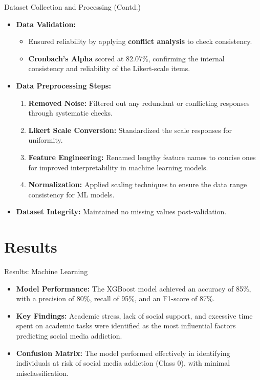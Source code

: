 \documentclass{beamer}
\begin{document}
\begin{frame}{Dataset Collection and Processing (Contd.)}
    \begin{itemize}
        \item \textbf{Data Validation:}
        \begin{itemize}
            \item Ensured reliability by applying \textbf{conflict analysis} to check consistency.
            \item \textbf{Cronbach's Alpha} scored at 82.07\%, confirming the internal consistency and reliability of the Likert-scale items.
        \end{itemize}
        
        \item \textbf{Data Preprocessing Steps:}
        \begin{enumerate}
            \item \textbf{Removed Noise:} Filtered out any redundant or conflicting responses through systematic checks.
            \item \textbf{Likert Scale Conversion:} Standardized the scale responses for uniformity.
            \item \textbf{Feature Engineering:} Renamed lengthy feature names to concise ones for improved interpretability in machine learning models.
            \item \textbf{Normalization:} Applied scaling techniques to ensure the data range consistency for ML models.
        \end{enumerate}

        \item \textbf{Dataset Integrity:} Maintained no missing values post-validation.
    \end{itemize}
\end{frame}





\section{Results}
\begin{frame}{Results: Machine Learning}
    \begin{itemize}
        \item \textbf{Model Performance:}
        The XGBoost model achieved an accuracy of 85\%, with a precision of 80\%, recall of 95\%, and an F1-score of 87\%.
        
        \item \textbf{Key Findings:}
        Academic stress, lack of social support, and excessive time spent on academic tasks were identified as the most influential factors predicting social media addiction.
        
        \item \textbf{Confusion Matrix:}
        The model performed effectively in identifying individuals at risk of social media addiction (Class 0), with minimal misclassification.
    \end{itemize}
\end{frame}
\end{document}
